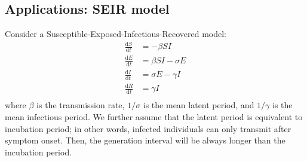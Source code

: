 \documentclass[12pt]{article}
\begin{document}
\subsection{Applications: SEIR model}

Consider a Susceptible-Exposed-Infectious-Recovered model:
\begin{equation}
\begin{aligned}
\frac{\mathrm{d}S}{\mathrm{d}t} &= - \beta S I\\
\frac{\mathrm{d}E}{\mathrm{d}t} &= \beta S I - \sigma E\\
\frac{\mathrm{d}I}{\mathrm{d}t} &= \sigma E - \gamma I \\
\frac{\mathrm{d}R}{\mathrm{d}t} &= \gamma I \\
\end{aligned}
\end{equation}
where $\beta$ is the transmission rate, $1/\sigma$ is the mean latent period, and $1/\gamma$ is the mean infectious period.
We further assume that the latent period is equivalent to incubation period; in other words, infected individuals can only transmit after symptom onset.
Then, the generation interval will be always longer than the incubation period.
\end{document}
